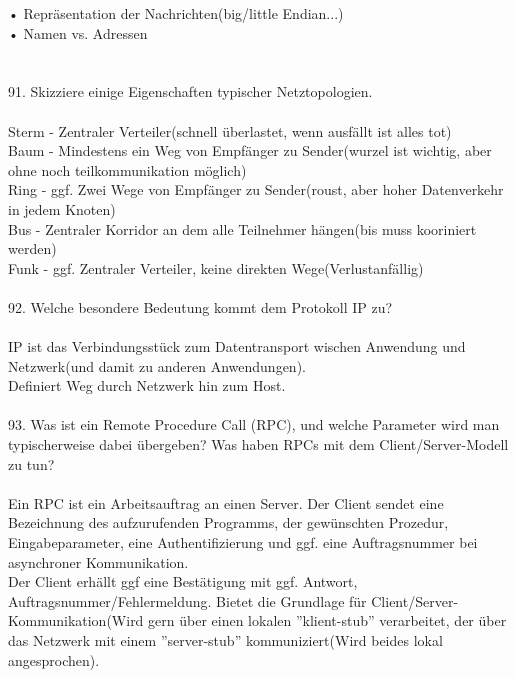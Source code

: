 \documentclass{article}
\begin{document}
• Repräsentation der Nachrichten(big/little Endian...)\\
• Namen vs. Adressen\\
\\
\\
91. Skizziere einige Eigenschaften typischer Netztopologien.
\\
\\
Sterm - Zentraler Verteiler(schnell \"uberlastet, wenn ausf\"allt ist alles tot)\\
Baum - Mindestens ein Weg von Empf\"anger zu Sender(wurzel ist wichtig, aber ohne noch teilkommunikation m\"oglich)\\
Ring - ggf. Zwei Wege von Empf\"anger zu Sender(roust, aber hoher Datenverkehr in jedem Knoten)\\
Bus - Zentraler Korridor an dem alle Teilnehmer h\"angen(bis muss kooriniert werden)\\
Funk - ggf. Zentraler Verteiler, keine direkten Wege(Verlustanf\"allig)
\\
\\
92. Welche besondere Bedeutung kommt dem Protokoll IP zu?
\\
\\
IP ist das Verbindungsst\"uck zum Datentransport wischen Anwendung und Netzwerk(und damit zu anderen Anwendungen).\\
Definiert Weg durch Netzwerk hin zum Host.
\\
\\
93. Was ist ein Remote Procedure Call (RPC), und welche Parameter wird man typischerweise
dabei übergeben? Was haben RPCs mit dem Client/Server-Modell zu tun?
\\
\\
Ein RPC ist ein Arbeitsauftrag an einen Server. Der Client sendet eine Bezeichnung des aufzurufenden Programms, der gew\"unschten Prozedur, Eingabeparameter, eine Authentifizierung und ggf. eine Auftragsnummer bei asynchroner Kommunikation.\\
Der Client erh\"allt ggf eine Best\"atigung mit ggf. Antwort, Auftragsnummer/Fehlermeldung.
Bietet die Grundlage f\"ur Client/Server-Kommunikation(Wird gern \"uber einen lokalen ''klient-stub'' verarbeitet, der \"uber das Netzwerk mit einem ''server-stub'' kommuniziert(Wird beides lokal angesprochen).
\\
\end{document}
